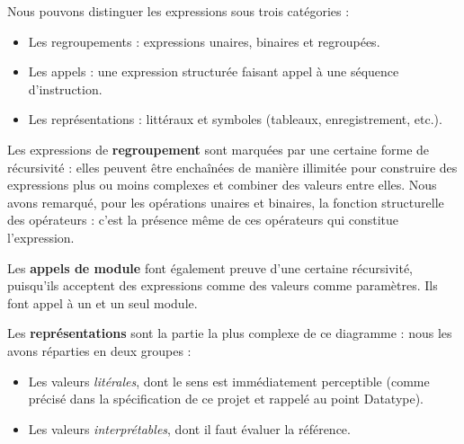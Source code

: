 \documentclass[oneside,a4paper]{book}
\begin{document}
Nous pouvons distinguer les expressions sous trois catégories :
\begin{itemize}
    \item Les regroupements : expressions unaires, binaires et regroupées.
    \item Les appels : une expression structurée faisant appel à une séquence d'instruction.
    \item Les représentations : littéraux et symboles (tableaux, enregistrement, etc.).
\end{itemize}

Les expressions de \textbf{regroupement} sont marquées par une certaine forme de récursivité : elles peuvent être enchaînées de manière illimitée pour construire des expressions plus ou moins complexes et combiner des valeurs entre elles. Nous avons remarqué, pour les opérations unaires et binaires, la fonction structurelle des opérateurs : c'est la présence même de ces opérateurs qui constitue l'expression.\newline

Les \textbf{appels de module} font également preuve d'une certaine récursivité, puisqu'ils acceptent des expressions comme des valeurs comme paramètres. Ils font appel à un et un seul module.\newline

\begin{samepage}
Les \textbf{représentations} sont la partie la plus complexe de ce diagramme : nous les avons réparties en deux groupes :
\begin{itemize}
    \item Les valeurs \textit{litérales}, dont le sens est immédiatement perceptible (comme précisé dans la spécification de ce projet et rappelé au point Datatype).
    \item Les valeurs \textit{interprétables}, dont il faut évaluer la référence.
\end{itemize}
\end{samepage}
\end{document}
